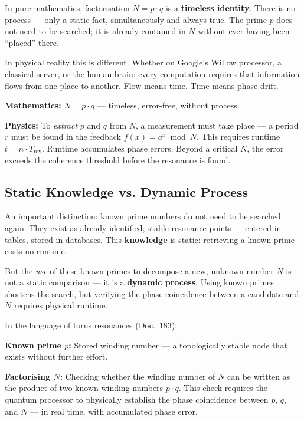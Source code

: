 In pure mathematics, factorisation $N = p \cdot q$ is a \textbf{timeless identity}.
There is no process — only a static fact, simultaneously and always true. The prime
$p$ does not need to be searched; it is already contained in $N$ without ever having
been ``placed'' there.

In physical reality this is different. Whether on Google's Willow processor, a
classical server, or the human brain: every computation requires that information
flows from one place to another. Flow means time. Time means phase drift.

\begin{keypoint}
\textbf{Mathematics:} $N = p \cdot q$ — timeless, error-free, without process.

\textbf{Physics:} To \emph{extract} $p$ and $q$ from $N$, a measurement must
take place — a period $r$ must be found in the feedback $f(x) = a^x \bmod N$.
This requires runtime $t = n \cdot T_\text{rev}$.
Runtime accumulates phase errors. Beyond a critical $N$, the error exceeds the
coherence threshold before the resonance is found.
\end{keypoint}

\subsection{Static Knowledge vs. Dynamic Process}

An important distinction: known prime numbers do not need to be searched again.
They exist as already identified, stable resonance points — entered in tables,
stored in databases. This \textbf{knowledge} is static: retrieving a known prime
costs no runtime.

But the \emph{use} of these known primes to decompose a new, unknown number $N$
is not a static comparison — it is a \textbf{dynamic process}. Using known primes
shortens the search, but verifying the phase coincidence between a candidate and $N$
requires physical runtime.

\begin{technical}
In the language of torus resonances (Doc.~183):

\textbf{Known prime $p$:} Stored winding number — a topologically stable node
that exists without further effort.

\textbf{Factorising $N$:} Checking whether the winding number of $N$ can be
written as the product of two known winding numbers $p \cdot q$. This check
requires the quantum processor to physically establish the phase coincidence
between $p$, $q$, and $N$ — in real time, with accumulated phase error.
\end{technical}


